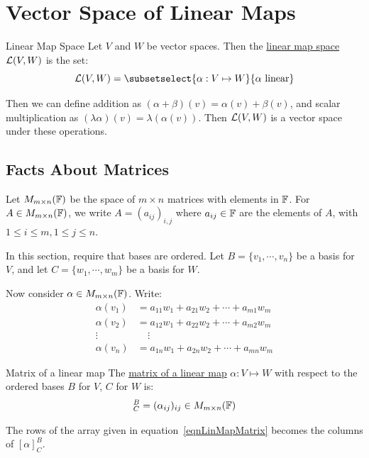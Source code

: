 \documentclass[../Main.tex]{subfiles}
\begin{document}
\section{Vector Space of Linear Maps}
\begin{definition}{Linear Map Space}
    Let $V$ and $W$ be vector spaces. Then the \underline{linear map space} $\mathcal{L}(V, W)$ is the set:
    \begin{equation*}
        \L(V, W) = \subsetselect{\alpha : V \mapsto W}{\alpha \text{ linear}}
    \end{equation*}
\end{definition}
Then we can define addition as $(\alpha + \beta)(v) = \alpha(v) + \beta(v)$, and scalar multiplication as $(\lambda \alpha)(v) = \lambda (\alpha(v))$. Then $\mathcal{L}(V, W)$ is a vector space under these operations.
\subsection{Facts About Matrices}
Let $M_{m \times n}(\mathbb{F})$ be the space of $m \times n$ matrices with elements in $\mathbb{F}$. For $A \in M_{m \times n}(\mathbb{F})$, we write $A = (a_{ij})_{i, j}$ where $a_{ij} \in \mathbb{F}$ are the elements of $A$, with $1 \leq i \leq m, 1 \leq j \leq n$.

In this section, require that bases are ordered. Let $B = \{v_1, \cdots, v_n\}$ be a basis for $V$, and let $C = \{w_1, \cdots, w_m\}$ be a basis for $W$.

Now consider $\alpha \in M_{m \times n}(\mathbb{F})$. Write:
\begin{align}
    \alpha(v_1) &= a_{11}w_1 + a_{21}w_2 + \cdots + a_{m1}w_m \nonumber \\
    \alpha(v_2) &= a_{12}w_1 + a_{22}w_2 + \cdots + a_{m2}w_m \label{eqnLinMapMatrix} \\
    \vdots~&~~~~~\vdots \nonumber \\
    \alpha(v_n) &= a_{1n}w_1 + a_{2n}w_2 + \cdots + a_{mn}w_m \nonumber
\end{align}
\begin{definition}{Matrix of a linear map}
    The \underline{matrix of a linear map} $\alpha : V \mapsto W$ with respect to the ordered bases $B$ for $V$, $C$ for $W$ is:
    \begin{equation*}
        [\alpha]_C^B = (\alpha_{ij})_{ij} \in M_{m \times n}(\F)
    \end{equation*}
\end{definition}
\begin{warning}
    The rows of the array given in equation~\ref{eqnLinMapMatrix} becomes the columns of $[\alpha]_{C}^B$.
\end{warning}
\end{document}
